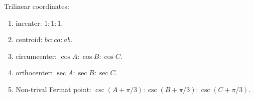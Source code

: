 Trilinear coordinates:
\begin{enumerate}
	\item incenter: $1:1:1$.
	\item centroid: $bc:ca:ab$.
	\item circumcenter: $\cos A:\cos B:\cos C$.
	\item orthocenter: $\sec A:\sec B:\sec C$.
	\item Non-trival Fermat point: $\csc(A+\pi/3):\csc(B+\pi/3):\csc(C+\pi/3)$.
\end{enumerate}

